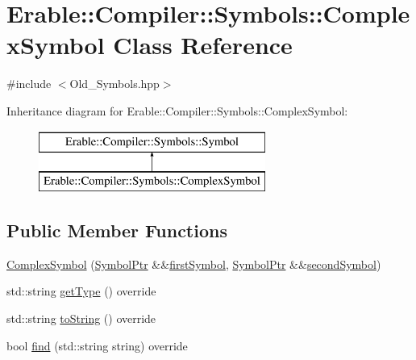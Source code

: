\hypertarget{class_erable_1_1_compiler_1_1_symbols_1_1_complex_symbol}{}\section{Erable\+::Compiler\+::Symbols\+::Complex\+Symbol Class Reference}
\label{class_erable_1_1_compiler_1_1_symbols_1_1_complex_symbol}


{\ttfamily \#include $<$Old\+\_\+\+Symbols.\+hpp$>$}

Inheritance diagram for Erable\+::Compiler\+::Symbols\+::Complex\+Symbol\+:\begin{figure}[H]
\begin{center}
\leavevmode
\includegraphics[height=2.000000cm]{class_erable_1_1_compiler_1_1_symbols_1_1_complex_symbol}
\end{center}
\end{figure}
\subsection*{Public Member Functions}
\begin{DoxyCompactItemize}
\item 
\mbox{\hyperlink{class_erable_1_1_compiler_1_1_symbols_1_1_complex_symbol_a706f187f6fbad0b424fe394f0dd80da9}{Complex\+Symbol}} (\mbox{\hyperlink{namespace_erable_1_1_compiler_1_1_symbols_a8f0bc762f448ea4d84e8713ab3e140b9}{Symbol\+Ptr}} \&\&\mbox{\hyperlink{class_erable_1_1_compiler_1_1_symbols_1_1_complex_symbol_a7fe7c20f27d1f04fb24c6070c53747ad}{first\+Symbol}}, \mbox{\hyperlink{namespace_erable_1_1_compiler_1_1_symbols_a8f0bc762f448ea4d84e8713ab3e140b9}{Symbol\+Ptr}} \&\&\mbox{\hyperlink{class_erable_1_1_compiler_1_1_symbols_1_1_complex_symbol_ac913a7c0d6b7d08f76516e84d79b3e2b}{second\+Symbol}})
\item 
std\+::string \mbox{\hyperlink{class_erable_1_1_compiler_1_1_symbols_1_1_complex_symbol_a868025e3a718e2ae6226a89403859b3a}{get\+Type}} () override
\item 
std\+::string \mbox{\hyperlink{class_erable_1_1_compiler_1_1_symbols_1_1_complex_symbol_a90d749e601a727d6d42ddb195e65ea37}{to\+String}} () override
\item 
bool \mbox{\hyperlink{class_erable_1_1_compiler_1_1_symbols_1_1_complex_symbol_a0b1517a55182a14119c73b4c58192dde}{find}} (std\+::string string) override
\end{DoxyCompactItemize}
